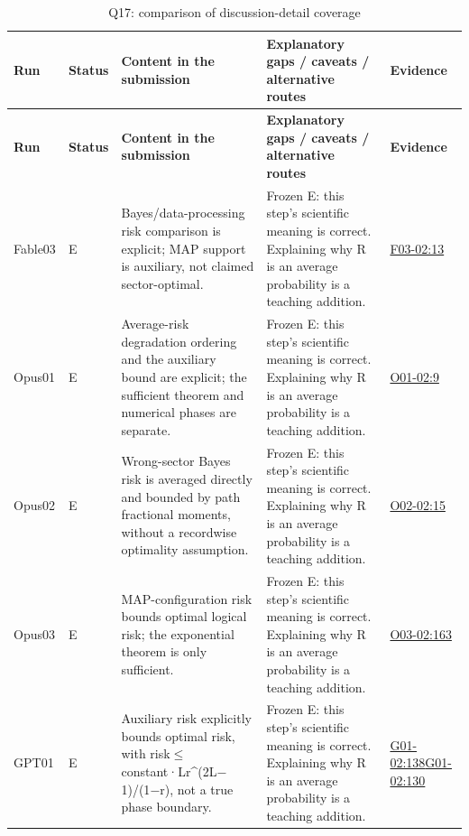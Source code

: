 \documentclass[11pt,a4paper]{article}
\begin{document}
{\fontsize{9.0}{12.6}\selectfont
\setlength{\tabcolsep}{2.5pt}
\begin{longtable}{>{\raggedright\arraybackslash}p{}>{\raggedright\arraybackslash}p{}>{\raggedright\arraybackslash}p{}>{\raggedright\arraybackslash}p{}>{\raggedright\arraybackslash}p{}}
\caption{Q17: comparison of discussion-detail coverage}\\
\toprule
\textbf{Run} & \textbf{Status} & \textbf{Content in the submission} & \textbf{Explanatory gaps /\allowbreak{} caveats /\allowbreak{} alternative routes} & \textbf{Evidence}\tabularnewline
\midrule
\endfirsthead
\toprule
\textbf{Run} & \textbf{Status} & \textbf{Content in the submission} & \textbf{Explanatory gaps /\allowbreak{} caveats /\allowbreak{} alternative routes} & \textbf{Evidence}\tabularnewline
\midrule
\endhead
{}Fable03 & E & Bayes/\allowbreak{}data-processing risk comparison is explicit; MAP support is auxiliary,\allowbreak{} not claimed sector-optimal. & Frozen E: this step’s scientific meaning is correct. Explaining why R is an average probability is a teaching addition. & \hyperref[src:F03-02]{F03-02:13}\tabularnewline
{}Opus01 & E & Average-risk degradation ordering and the auxiliary bound are explicit; the sufficient theorem and numerical phases are separate. & Frozen E: this step’s scientific meaning is correct. Explaining why R is an average probability is a teaching addition. & \hyperref[src:O01-02]{O01-02:9}\tabularnewline
{}Opus02 & E & Wrong-sector Bayes risk is averaged directly and bounded by path fractional moments,\allowbreak{} without a recordwise optimality assumption. & Frozen E: this step’s scientific meaning is correct. Explaining why R is an average probability is a teaching addition. & \hyperref[src:O02-02]{O02-02:15}\tabularnewline
{}Opus03 & E & MAP-configuration risk bounds optimal logical risk; the exponential theorem is only sufficient. & Frozen E: this step’s scientific meaning is correct. Explaining why R is an average probability is a teaching addition. & \hyperref[src:O03-02]{O03-02:163}\tabularnewline
{}GPT01 & E & Auxiliary risk explicitly bounds optimal risk,\allowbreak{} with risk\ensuremath{\leq}constant·Lr\textasciicircum{}(2L\ensuremath{-}1)/\allowbreak{}(1\ensuremath{-}r),\allowbreak{} not a true phase boundary. & Frozen E: this step’s scientific meaning is correct. Explaining why R is an average probability is a teaching addition. & \hyperref[src:G01-02]{G01-02:138}\newline \hyperref[src:G01-02]{G01-02:130}\tabularnewline

\end{longtable}}
\end{document}

